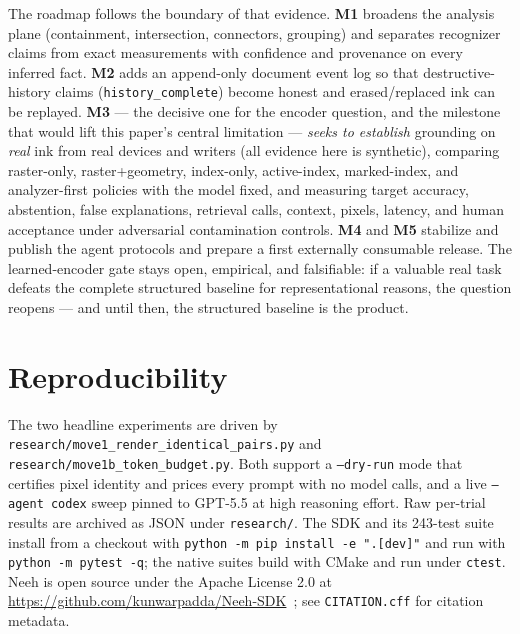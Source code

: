 \documentclass[11pt]{article}
\newcommand{\code}[1]{\texttt{#1}}
\begin{document}
The roadmap follows the boundary of that evidence. \textbf{M1} broadens the
analysis plane (containment, intersection, connectors, grouping) and separates
recognizer claims from exact measurements with confidence and provenance on every
inferred fact. \textbf{M2} adds an append-only document event log so that
destructive-history claims (\code{history\_complete}) become honest and
erased/replaced ink can be replayed. \textbf{M3} --- the decisive one for the
encoder question, and the milestone that would lift this paper's central
limitation --- \emph{seeks to establish} grounding on \emph{real} ink from real
devices and writers (all evidence here is synthetic), comparing raster-only,
raster+geometry, index-only, active-index,
marked-index, and analyzer-first policies with the model fixed, and measuring
target accuracy, abstention, false explanations, retrieval calls, context,
pixels, latency, and human acceptance under adversarial contamination controls.
\textbf{M4} and \textbf{M5} stabilize and publish the agent protocols and prepare
a first externally consumable release. The learned-encoder gate stays open,
empirical, and falsifiable: if a valuable real task defeats the complete
structured baseline for representational reasons, the question reopens --- and
until then, the structured baseline is the product.

\section*{Reproducibility}

The two headline experiments are driven by \code{research/move1\_render\_identical\_pairs.py}
and \code{research/move1b\_token\_budget.py}. Both support a \code{--dry-run} mode
that certifies pixel identity and prices every prompt with no model calls, and a
live \code{--agent codex} sweep pinned to GPT-5.5 at high reasoning effort. Raw
per-trial results are archived as JSON under \code{research/}. The SDK and its
243-test suite install from a checkout with \code{python -m pip install -e ".[dev]"}
and run with \code{python -m pytest -q}; the native suites build with CMake and
run under \code{ctest}. Neeh is open source under the Apache License 2.0 at
\url{https://github.com/kunwarpadda/Neeh-SDK}~\cite{neeh}; see \code{CITATION.cff}
for citation metadata.
\end{document}
